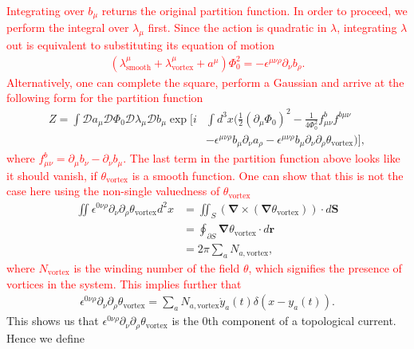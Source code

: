 \textcolor{red}{Integrating over $b_{\mu}$ returns the original partition function. In order to proceed, we perform the integral over $\lambda_{\mu}$ first. Since the action is quadratic in $\lambda$, integrating $\lambda$ out is equivalent to substituting its equation of motion
\begin{align}
    \left(\lambda^{\mu}_{\text{smooth}} +\lambda^{\mu}_{\text{vortex}} +a^{\mu} \right) \Phi_0^2=- \epsilon^{\mu \nu \rho} \partial_{\nu} b_{\rho}.
\end{align}
Alternatively, one can complete the square, perform a Gaussian and arrive at the following form for the partition function}
\begin{align}
    Z= \int \mathcal{D}a_{\mu} \mathcal{D}\Phi_0 \mathcal{D} \lambda_{\mu} \mathcal{D} b_{\mu} \exp\bigg[i& \int d^3x \bigg(\frac{1}{2} \left(\partial_{\mu} \Phi_0 \right)^2- \frac{1}{4\Phi_0^2} f_{\mu\nu}^{b} f^{b \mu \nu} \nonumber\\
    &- \epsilon^{\mu \nu \rho} b_{\mu} \partial_{\nu} a_{\rho} -\epsilon^{\mu \nu \rho} b_{\mu} \partial_{\nu} \partial_{\rho} \theta_{\text{vortex}}  \bigg) \bigg],
\end{align}
 \textcolor{red}{where $f_{\mu \nu}^{b} = \partial_{\mu} b_{\nu} - \partial_{\nu} b_{\mu}$. The last term in the partition function above looks like it should vanish, if $\theta_{\text{vortex}}$ is a smooth function. One can show that this is not the case here using the non-single valuedness of $\theta_{\text{vortex}}$  } 
\begin{align}
    \iint \epsilon^{0 \nu \rho} \partial_{\nu} \partial_{\rho} \theta_{\text{vortex}} d^2x&=\iint_{S} \left( { \bm \nabla} \times ({ \bm \nabla} \theta_{\text{vortex}})\right) \cdot d{ \bm S}\nonumber\\
    &= \oint_{\partial S} {\bm \nabla} \theta_{\text{vortex}}\cdot d {\bm r}  \nonumber \\
    &= 2\pi \sum_{a} N_{a,\text{vortex}},
\end{align}
\textcolor{red}{where $N_{\text{vortex}}$ is the winding number of the field $\theta$, which signifies the presence of vortices in the system. This implies further that }
\begin{align}
    \epsilon^{0 \nu \rho} \partial_{\nu} \partial_{\rho} \theta_{\text{vortex}} =\sum_{a} N_{a,\text{vortex}} \dot{y}_a(t)  \delta\left(x-y_a(t) \right).
\end{align}
This shows us that $\epsilon^{0 \nu \rho} \partial_{\nu} \partial_{\rho} \theta_{\text{vortex}}$ is the $0$th component of a topological current. Hence we define
